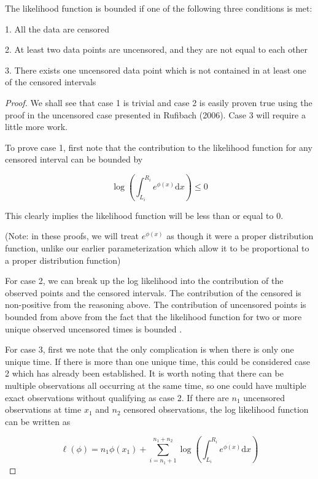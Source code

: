 	The likelihood function is bounded if one of the following three conditions is met:
	
	1. All the data are censored
	
	2. At least two data points are uncensored, and they are not equal to each other
	
	3. There exists one uncensored data point which is not contained in at least one of the censored intervals
		
	\begin{proof}
	
	We shall see that case 1 is trivial and case 2 is easily proven true using the proof in the uncensored case presented in Rufibach (2006). Case 3 will require a little more work. 
	
	To prove case 1, first note that the contribution to the likelihood function for any censored interval can be bounded by
	
	\[
	\displaystyle \log \left( \int_{L_i}^{R_i} e^{\phi(x)} \mathrm{d}x \right) \leq 0
	\]
	
	This clearly implies the likelihood function will be less than or equal to 0. 

	(Note: in these proofs, we will treat $e^{\phi(x)}$ as though it were a proper distribution function, unlike our earlier parameterization which allow it to be proportional to a proper distribution function)
		
	For case 2, we can break up the log likelihood into the contribution of the observed points and the censored intervals. The contribution of the censored is non-positive from the reasoning above. The contribution of uncensored points is bounded from above from the fact that the likelihood function for two or more unique observed uncensored times is bounded \cite{RefRuf2006}.
	
	For case 3, first we note that the only complication is when there is only one unique time. If there is more than one unique time, this could be considered case 2 which has already been established. It is worth noting that there can be multiple observations all occurring at the same time, so one could have multiple exact observations without qualifying as case 2. If there are $n_1$ uncensored observations at time $x_1$ and $n_2$ censored observations, the log likelihood function can be written as
	
	\[
	\ell (\phi) = \displaystyle  n_1\phi(x_1) + \sum_{i = n_1+ 1} ^{n_1 + n_2} \log \left( \int_{L_i}^{R_i} e^{\phi(x) } \mathrm{d}x \right)
	\]
	

\end{proof}
